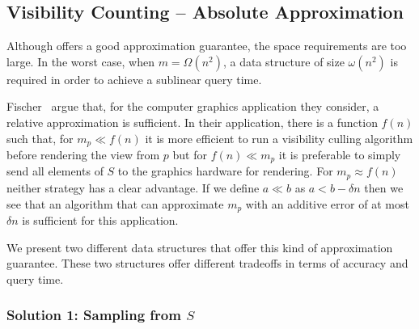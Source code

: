\documentclass{patmorin}
\begin{document}
\subsection{Visibility Counting -- Absolute Approximation}

Although  offers a good approximation guarantee,
the space requirements are too large.  In the worst case, when
$m=\Omega(n^2)$, a data structure of size $\omega(n^2)$ is required in
order to achieve a sublinear query time.

Fischer \etal\ argue that, for the computer graphics application they
consider, a relative approximation is sufficient.  In their application,
there is a function $f(n)$ such that, for $m_p\ll f(n)$ it is more
efficient to run a visibility culling algorithm before rendering the
view from $p$ but for $f(n) \ll m_p$ it is preferable to simply send all
elements of $S$ to the graphics hardware for rendering.  For $m_p\approx
f(n)$ neither strategy has a clear advantage.  If we define $a \ll b$
as $a < b - \delta n$ then we see that an algorithm that can approximate
$m_p$ with an additive error of at most $\delta n$ is sufficient for
this application.

We present two different data structures that offer this kind of
approximation guarantee.  These two structures offer different tradeoffs
in terms of accuracy and query time.

\subsubsection{Solution 1: Sampling from $S$}
\end{document}
